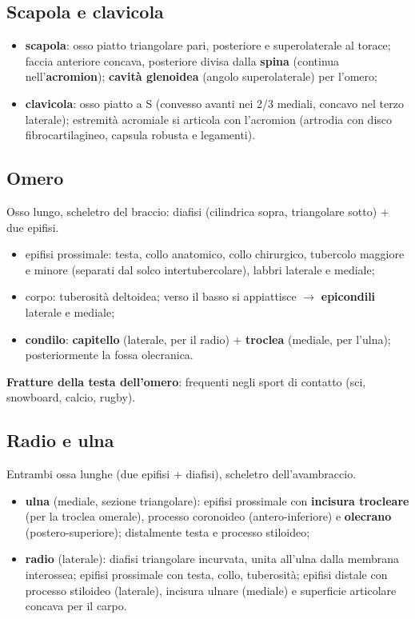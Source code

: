 \subsection{Scapola e clavicola}
\begin{itemize}
  \item \textbf{scapola}: osso piatto triangolare pari, posteriore e superolaterale al torace;
    faccia anteriore concava, posteriore divisa dalla \textbf{spina} (continua nell'\textbf{acromion});
    \textbf{cavità glenoidea} (angolo superolaterale) per l'omero;
  \item \textbf{clavicola}: osso piatto a S (convesso avanti nei 2/3 mediali, concavo nel terzo
    laterale); estremità acromiale si articola con l'acromion (artrodia con disco fibrocartilagineo,
    capsula robusta e legamenti).
\end{itemize}

\subsection{Omero}
Osso lungo, scheletro del braccio: diafisi (cilindrica sopra, triangolare sotto) + due epifisi.
\begin{itemize}
  \item epifisi prossimale: testa, collo anatomico, collo chirurgico, tubercolo maggiore e minore
    (separati dal solco intertubercolare), labbri laterale e mediale;
  \item corpo: tuberosità deltoidea; verso il basso si appiattisce $\rightarrow$ \textbf{epicondili}
    laterale e mediale;
  \item \textbf{condilo}: \textbf{capitello} (laterale, per il radio) + \textbf{troclea} (mediale,
    per l'ulna); posteriormente la fossa olecranica.
\end{itemize}
\textbf{Fratture della testa dell'omero}: frequenti negli sport di contatto (sci, snowboard, calcio,
rugby).

\subsection{Radio e ulna}
Entrambi ossa lunghe (due epifisi + diafisi), scheletro dell'avambraccio.
\begin{itemize}
  \item \textbf{ulna} (mediale, sezione triangolare): epifisi prossimale con \textbf{incisura
    trocleare} (per la troclea omerale), processo coronoideo (antero-inferiore) e \textbf{olecrano}
    (postero-superiore); distalmente testa e processo stiloideo;
  \item \textbf{radio} (laterale): diafisi triangolare incurvata, unita all'ulna dalla membrana
    interossea; epifisi prossimale con testa, collo, tuberosità; epifisi distale con processo
    stiloideo (laterale), incisura ulnare (mediale) e superficie articolare concava per il carpo.
\end{itemize}

